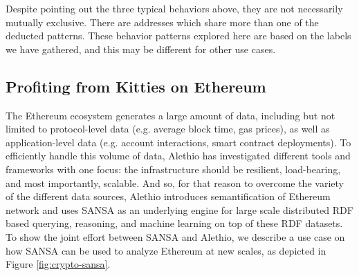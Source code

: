 Despite pointing out the three typical behaviors above, they are not necessarily mutually exclusive.
There are addresses which share more than one of the deducted patterns.
These behavior patterns explored here are based on the labels we have gathered, and this may be different for other use cases.


\subsection{Profiting from Kitties on Ethereum}
\label{sec:kitties-use-case}

The Ethereum ecosystem generates a large amount of data, including but not limited to protocol-level data (e.g. average block time, gas prices), as well as application-level data (e.g. account interactions, smart contract deployments). 
To efficiently handle this volume of data, Alethio has investigated different tools and frameworks with one focus: the infrastructure should be resilient, load-bearing, and most importantly, scalable.
And so, for that reason to overcome the variety of the different data sources, Alethio introduces semantification of Ethereum network and uses SANSA as an underlying engine for large scale distributed RDF based querying, reasoning, and machine learning on top of these RDF datasets.
To show the joint effort between SANSA and Alethio, we describe a use case on how SANSA can be used to analyze Ethereum at new scales, as depicted in Figure \ref{fig:crypto-sansa}. 

